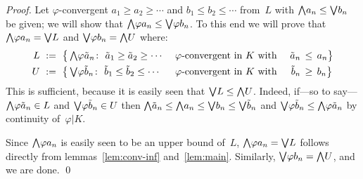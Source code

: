 \documentclass[main.tex]{subfiles}
\begin{document}
\begin{proof}
Let $\varphi$-convergent
$a_1 \geq a_2 \geq \dotsb$ and $b_1 \leq b_2 \leq \dotsb$ from~$L$
with $\textstyle{\bigwedge} a_n \leq \textstyle{\bigvee} b_n$ be given;
we will show that $\textstyle{\bigwedge} \varphi a_n \leq \textstyle{\bigvee} \varphi b_n$.
To this end we will prove that 
$\textstyle{\bigwedge} \varphi a_n = \textstyle{\bigvee} L$ and
$\textstyle{\bigvee} \varphi b_n = \textstyle{\bigwedge} U$
where:
\begin{alignat*}{3}
L\  &:=\ \bigl\{ \, \bw\varphi \tilde a_n \colon \ 
                 \tilde a_1 \geq \tilde a_2 \geq \dotsb \  &&
                 \varphi\text{-convergent in }
                 K\text{ with }&\tilde a_n\,&\leq\, a_n \bigr\} \\
U\  &:=\ \bigl\{ \, \bv\varphi \tilde b_n \colon \ 
                 \tilde b_1 \leq \tilde b_2 \leq \dotsb \ &&
                 \varphi\text{-convergent in }
                 K\text{ with }&\tilde b_n\,&\geq\,b_n \bigr\} \\
\end{alignat*}
This is sufficient,
because it is easily seen that $\textstyle{\bigvee} L \leq \textstyle{\bigwedge} U$.
Indeed,
if---so to say---$\textstyle{\bigwedge} \varphi \tilde a_n \in L$
and $\textstyle{\bigvee} \varphi \tilde b_n \in U$
then $\textstyle{\bigwedge}\tilde a_n \leq \textstyle{\bigwedge} a_n \leq \textstyle{\bigvee} b_n \leq \textstyle{\bigvee} \tilde b_n$
and $\textstyle{\bigvee} \varphi \tilde b_n \leq \textstyle{\bigwedge} \varphi \tilde a_n$
by continuity of~$\varphi|K$.

Since $\textstyle{\bigwedge} \varphi a_n$ is easily seen to be an upper bound of~$L$,\quad
 $\textstyle{\bigwedge} \varphi a_n = \textstyle{\bigvee} L$\quad
follows directly from lemmas~\ref{lem:conv-inf} and~\ref{lem:main}.
Similarly, $\textstyle{\bigvee}\varphi b_n = \textstyle{\bigwedge} U$, 
and we are done. \qed
\end{proof}
\end{document}
